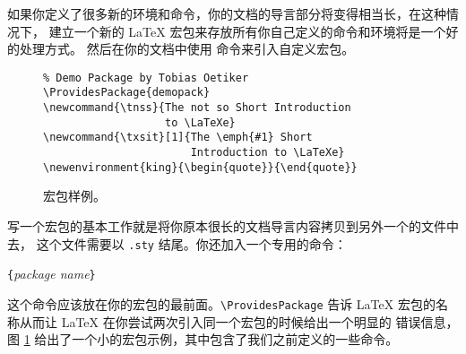 如果你定义了很多新的环境和命令，你的文档的导言部分将变得相当长，在这种情况下，
建立一个新的 \LaTeX{} 宏包来存放所有你自己定义的命令和环境将是一个好的处理方式。
然后在你的文档中使用  命令来引入自定义宏包。

\begin{figure}[!htbp]
\begin{lined}{\textwidth}
\begin{verbatim}
% Demo Package by Tobias Oetiker
\ProvidesPackage{demopack}
\newcommand{\tnss}{The not so Short Introduction
                   to \LaTeXe}
\newcommand{\txsit}[1]{The \emph{#1} Short
                       Introduction to \LaTeXe}
\newenvironment{king}{\begin{quote}}{\end{quote}}
\end{verbatim}
\end{lined}
\caption{宏包样例。} \label{package}
\end{figure}

写一个宏包的基本工作就是将你原本很长的文档导言内容拷贝到另外一个的文件中去，
 这个文件需要以 \texttt{.sty} 结尾。你还加入一个专用的命令：
\begin{lscommand}
\verb|{|\emph{package name}\verb|}|
\end{lscommand}
\noindent 这个命令应该放在你的宏包的最前面。\verb|\ProvidesPackage| 告诉 \LaTeX{} 
宏包的名称从而让 \LaTeX{} 在你尝试两次引入同一个宏包的时候给出一个明显的
错误信息，图 \ref{package} 给出了一个小的宏包示例，其中包含了我们之前定义的一些命令。

